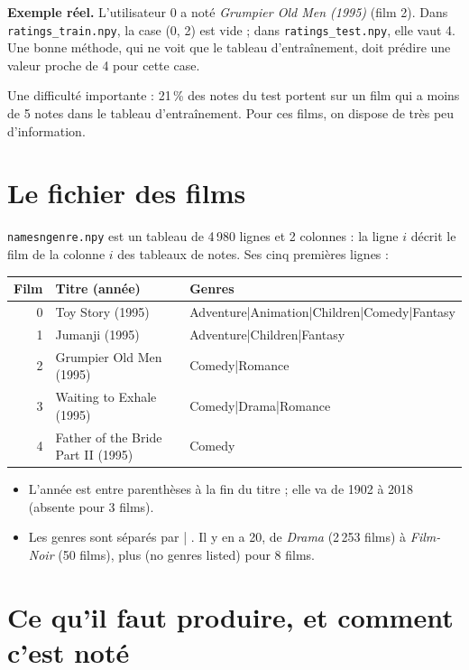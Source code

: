 \documentclass[11pt,a4paper]{article}
\begin{document}
\textbf{Exemple réel.} L'utilisateur 0 a noté \emph{Grumpier Old Men (1995)} (film 2).
Dans \texttt{ratings\_train.npy}, la case (0, 2) est vide ; dans \texttt{ratings\_test.npy},
elle vaut 4. Une bonne méthode, qui ne voit que le tableau d'entraînement, doit prédire
une valeur proche de 4 pour cette case.

Une difficulté importante : 21\,\% des notes du test portent sur un film qui a moins de
5 notes dans le tableau d'entraînement. Pour ces films, on dispose de très peu
d'information.

\section{Le fichier des films}\label{sec:films}

\texttt{namesngenre.npy} est un tableau de 4\,980 lignes et 2 colonnes : la ligne $i$
décrit le film de la colonne $i$ des tableaux de notes. Ses cinq premières lignes :

\begin{center}
\begin{tabular}{rll}
\toprule
\textbf{Film} & \textbf{Titre (année)} & \textbf{Genres} \\
\midrule
0 & Toy Story (1995) & Adventure|Animation|Children|Comedy|Fantasy \\
1 & Jumanji (1995) & Adventure|Children|Fantasy \\
2 & Grumpier Old Men (1995) & Comedy|Romance \\
3 & Waiting to Exhale (1995) & Comedy|Drama|Romance \\
4 & Father of the Bride Part II (1995) & Comedy \\
\bottomrule
\end{tabular}
\end{center}

\begin{itemize}
  \item L'année est entre parenthèses à la fin du titre ; elle va de 1902 à 2018
        (absente pour 3 films).
  \item Les genres sont séparés par \og | \fg. Il y en a 20, de \emph{Drama}
        (2\,253 films) à \emph{Film-Noir} (50 films), plus \og (no genres listed) \fg
        pour 8 films.
\end{itemize}

\section{Ce qu'il faut produire, et comment c'est noté}
\end{document}
